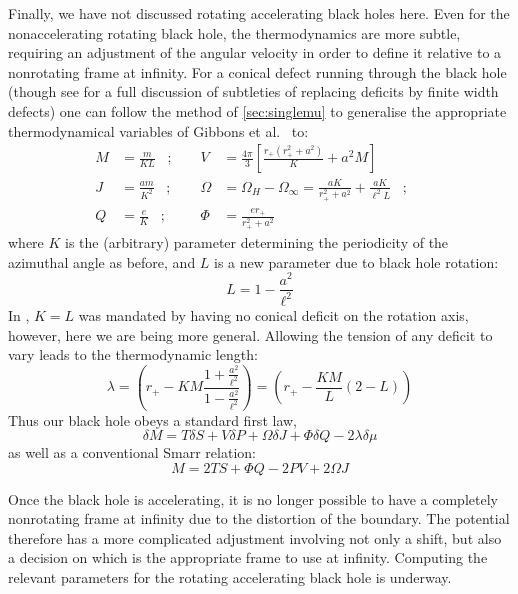 \documentclass[
twoside,
openright,
frontopenright,
]{dmathesis}
\begin{document}
Finally, we have not discussed rotating accelerating black holes here. Even for
the nonaccelerating rotating black hole, the thermodynamics are more subtle,
requiring an adjustment of the angular velocity \cite{Gibbons:2004ai} in order
to define it relative to a nonrotating frame at infinity. For a conical defect
running through the black hole (though see
\cite{Gregory:2013xca,Gregory:2014uca} for a full discussion of subtleties of
replacing deficits by finite width defects) one can follow the method of
\cref{sec:singlemu} to generalise the appropriate thermodynamical variables of
Gibbons et al.\ \cite{Gibbons:2004ai} to:
\begin{equation}
  \begin{aligned}
M &= \frac{m}{KL} \;\;\;; \;\;\;\;&
V &= \frac{4\pi}{3} \left [ \frac{r_+(r_+^2+a^2)}{K} + a^2 M \right]\\
J &= \frac{am}{K^2} \;\;\;; \;\;\;\;&
\Omega &= \Omega_H-\Omega_\infty
= \frac{aK}{r_+^2+a^2} + \frac{aK}{\ell^2 L} \;\;\;; \;\;\;\;\\
Q &= \frac{e}{K} \;\;\;;\;\;\;\;& \Phi &= \frac{er_+}{r_+^2+a^2}
\end{aligned}
\end{equation}
where $K$ is the (arbitrary) parameter determining the periodicity of the
azimuthal angle as before, and $L$ is a new parameter due to black hole
rotation:
\begin{equation}
L = 1 - \frac{a^2}{\ell^2}
\end{equation}
In \cite{Gibbons:2004ai}, $K=L$ was mandated by having no conical deficit on the
rotation axis, however, here we are being more general. Allowing the tension of
any deficit to vary leads to the thermodynamic length:
\begin{equation}
\lambda = \left ( r_+ - KM \frac{1+\frac{a^2}{\ell^2}}{1-\frac{a^2}{\ell^2}} \right)
= \left ( r_+ - \frac{KM}{L}(2-L) \right)
\end{equation}
Thus our black hole obeys a standard first law, 
\begin{equation}
\delta M = T \delta S + V \delta P + \Omega \delta J + \Phi \delta Q
-2 \lambda \delta\mu
\end{equation}
as well as a conventional Smarr relation:
\begin{equation}
M
= 2TS + \Phi Q - 2 PV + 2 \Omega J
\end{equation}

Once the black hole is accelerating, it is no longer possible to have a
completely nonrotating frame at infinity due to the distortion of the
boundary. The potential therefore has a more complicated adjustment involving
not only a shift, but also a decision on which is the appropriate frame to use
at infinity. Computing the relevant parameters for the rotating accelerating
black hole is underway.
\end{document}
